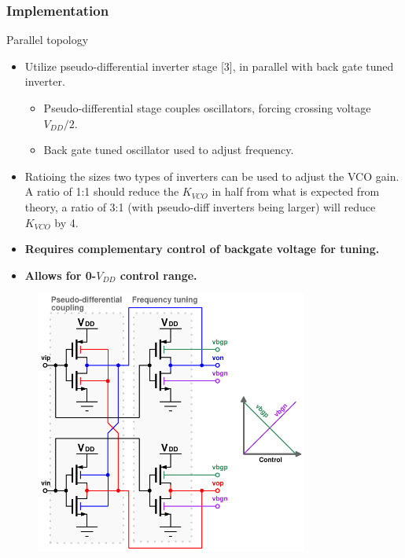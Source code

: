 \documentclass[t, screen, aspectratio=43]{beamer}
\begin{document}
\begin{frame}
	\frametitle{Implementation}
	\begin{block}{Parallel topology}
		\begin{minipage}{6cm}
			\vspace{1em}
			\tiny

			\begin{itemize}[itemsep=4pt,label=\protect---]
				\item Utilize pseudo-differential inverter stage [3], in parallel with back gate tuned inverter.
				\begin{itemize}[itemsep=4pt,label=$\bullet$]
					\item Pseudo-differential stage couples oscillators, forcing crossing voltage $V_{DD}/2$.
					\item Back gate tuned oscillator used to adjust frequency.
				\end{itemize}			
				\item Ratioing the sizes two types of inverters can be used to adjust the VCO gain. A ratio of 1:1 should reduce the $K_{VCO}$ in half from what is expected from theory, a ratio of 3:1 (with pseudo-diff inverters being larger) will reduce $K_{VCO}$ by 4. 
				\item \textbf{Requires complementary control of backgate voltage for tuning.}
				\item \textbf{\color{red}Allows for 0-$V_{DD}$ control range.	}
			\end{itemize}
		\end{minipage}%
		\begin{minipage}{6cm}
			\begin{figure}[htb!]
			        \centering
			        \includegraphics[width=0.8\textwidth, angle=0]{parallel_delay_cell}
			\end{figure}
		\end{minipage}%

	\end{block}	
\end{frame}
\end{document}
